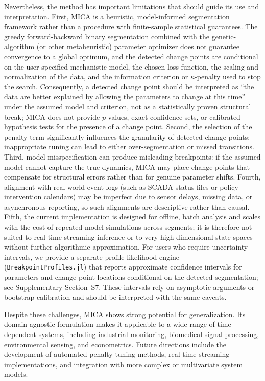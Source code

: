 \documentclass[10pt,letterpaper]{article}
\begin{document}
Nevertheless, the method has important limitations that should guide its use and interpretation. First, MICA is a heuristic, model-informed segmentation framework rather than a procedure with finite-sample statistical guarantees. The greedy forward-backward binary segmentation combined with the genetic-algorithm (or other metaheuristic) parameter optimizer does not guarantee convergence to a global optimum, and the detected change points are conditional on the user-specified mechanistic model, the chosen loss function, the scaling and normalization of the data, and the information criterion or $\kappa$-penalty used to stop the search. Consequently, a detected change point should be interpreted as ``the data are better explained by allowing the parameters to change at this time'' under the assumed model and criterion, not as a statistically proven structural break; MICA does not provide $p$-values, exact confidence sets, or calibrated hypothesis tests for the presence of a change point. Second, the selection of the penalty term significantly influences the granularity of detected change points; inappropriate tuning can lead to either over-segmentation or missed transitions. Third, model misspecification can produce misleading breakpoints: if the assumed model cannot capture the true dynamics, MICA may place change points that compensate for structural errors rather than for genuine parameter shifts. Fourth, alignment with real-world event logs (such as SCADA status files or policy intervention calendars) may be imperfect due to sensor delays, missing data, or asynchronous reporting, so such alignments are descriptive rather than causal. Fifth, the current implementation is designed for offline, batch analysis and scales with the cost of repeated model simulations across segments; it is therefore not suited to real-time streaming inference or to very high-dimensional state spaces without further algorithmic approximation. For users who require uncertainty intervals, we provide a separate profile-likelihood engine (\texttt{BreakpointProfiles.jl}) that reports approximate confidence intervals for parameters and change-point locations conditional on the detected segmentation; see Supplementary Section~S7. These intervals rely on asymptotic arguments or bootstrap calibration and should be interpreted with the same caveats.

Despite these challenges, MICA shows strong potential for generalization. Its domain-agnostic formulation makes it applicable to a wide range of time-dependent systems, including industrial monitoring, biomedical signal processing, environmental sensing, and econometrics. Future directions include the development of automated penalty tuning methods, real-time streaming implementations, and integration with more complex or multivariate system models.
\end{document}
